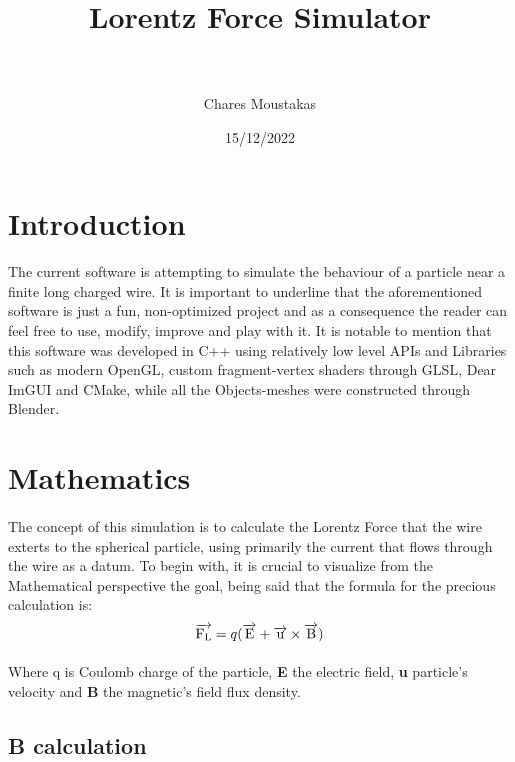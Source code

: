 \documentclass{article}
\title{
	{
	Lorentz Force Simulator \\
	\vspace{3cm}
	} \\
	
}
\author{Chares Moustakas}
\date{15/12/2022}
\begin{document}
	\maketitle




\section{Introduction}
	\paragraph{}
	The current software is attempting to simulate the behaviour of a particle near a finite long charged wire. It is important to underline that the aforementioned software is just a fun, non-optimized project and as a consequence the reader can feel free to use, modify, improve and play with it. It is notable to mention that this software was developed in C++ using relatively low level APIs and Libraries such as modern OpenGL, custom fragment-vertex shaders through GLSL, Dear ImGUI and CMake, while all the Objects-meshes were constructed through Blender.     

\section{Mathematics}
	\paragraph{}
	The concept of this simulation is to calculate the Lorentz Force that the wire exterts to the spherical particle, using primarily the current that flows through the wire as a datum. To begin with, it is crucial to visualize from the Mathematical perspective the goal, being said that the formula for the precious calculation is:  
			\begin{equation*}
			\overrightarrow{\rm F_{L}} = q(\overrightarrow{\rm E} + \overrightarrow{\rm u} \times \overrightarrow{\rm B})
			\end{equation*}
	
	\paragraph{}
	Where q is Coulomb charge of the particle, \textbf{E} the electric field, \textbf{u} particle's velocity and \textbf{B} the magnetic's field flux density. 
	\subsection{B calculation}
\end{document}
